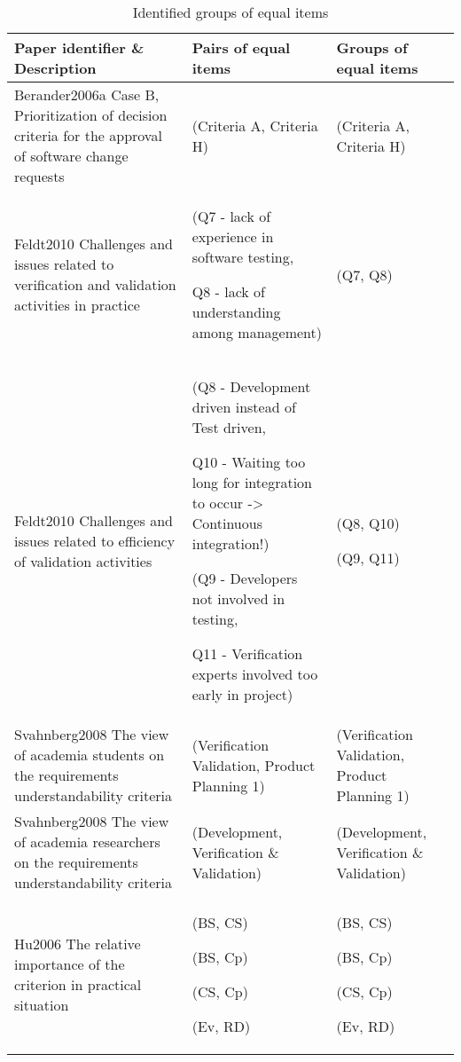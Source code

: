 %
\begin{table*}
\caption{\label{tab:ECVresult-1}Identified groups of equal items}


\begin{tabular}{
|>{\centering}p{}
|>{\centering}p{}
|>{\centering}p{}|}
\hline 
Paper identifier \& Description  & Pairs of equal items  & Groups of equal items\tabularnewline
\hline

Berander2006a \citep{Berander2006a} Case B, Prioritization of decision criteria for the approval of software
change requests  & (Criteria A, Criteria H)  & (Criteria A, Criteria H)\tabularnewline
\hline

Feldt2010 \citep{Feldt2010} Challenges and issues related to verification and validation activities in practice & 
(Q7 - lack of experience in software testing, 

Q8 - lack of understanding among management) &
(Q7, Q8)\tabularnewline
\hline 

Feldt2010 \citep{Feldt2010} Challenges and issues related to efficiency of validation activities &
(Q8 - \textquotedbl{}Development driven\textquotedbl{} instead of \textquotedbl{}Test driven\textquotedbl{},

Q10 - Waiting too long for integration to occur -> Continuous integration!) 

(Q9 - Developers not involved in testing, 

Q11 - Verification experts involved too early in project) &

(Q8, Q10) 

(Q9, Q11)
\tabularnewline
\hline 


Svahnberg2008 \citep{Svahnberg2008} The view of academia students on the requirements understandability
criteria  & (Verification Validation, Product Planning 1)  & (Verification Validation, Product Planning 1)\tabularnewline
\hline 
Svahnberg2008 \citep{Svahnberg2008} The view of academia researchers on the requirements understandability
criteria  & (Development, Verification \& Validation) & (Development, Verification \& Validation)\tabularnewline
\hline 
Hu2006\citep{Hu2006} The relative importance of the criterion in practical situation & (BS, CS)

(BS, Cp)

(CS, Cp)

(Ev, RD) & (BS, CS)

(BS, Cp)

(CS, Cp)

(Ev, RD)\tabularnewline
\hline 



\end{tabular}
\end{table*}
